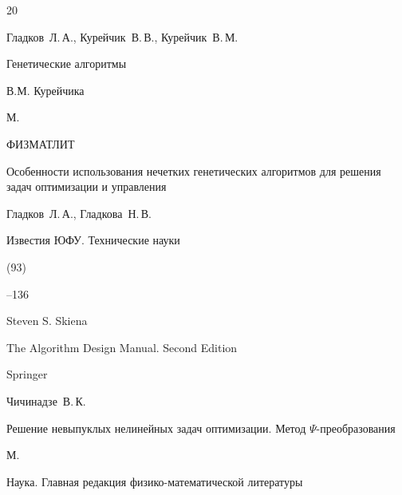 \begin{thebibliography}{20}

\by Гладков~Л.\,А., Курейчик~В.\,В., Курейчик~В.\,М.

\book Генетические алгоритмы

\ed В.М. Курейчика

\publaddr М.

\publ ФИЗМАТЛИТ







\paper Особенности использования нечетких генетических алгоритмов для решения задач оптимизации и управления

\by Гладков~Л.\,А., Гладкова~Н.\,В.

\jour Известия ЮФУ. Технические науки


(93)

--136





\by Steven S. Skiena

\book The Algorithm Design Manual. Second Edition

\publ Springer







\by Чичинадзе~В.\,К.

\book Решение невыпуклых нелинейных задач оптимизации. Метод $\Psi$-преобразования

\publaddr М.

\publ Наука. Главная редакция физико-математической литературы



\end{thebibliography}
